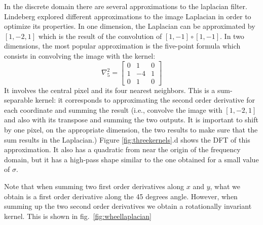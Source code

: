 In the discrete domain there are several approximations to the laplacian filter. Lindeberg \cite{} explored different approximations to the image Laplacian in order to optimize its properties. In one dimension, the Laplacian can be approximated by $\left[ 1,-2,1 \right]$ which is the result of the convolution of $\left[1,-1 \right] \circ \left[1,-1 \right]$.
In two dimensions, the most popular approximation is the five-point formula which consists in convolving the image with the kernel:
\begin{equation}
\nabla_5^2 = 
\begin{bmatrix}
  0& 1 & 0 \\
  1 & -4 & 1\\
  0 &  1 & 0
\end{bmatrix}
\end{equation}
It involves the central pixel and its four nearest neighbors. This is a sum-separable kernel: it corresponds to approximating the second order derivative for each coordinate and summing the result (i.e., convolve the image with $\left[1,-2,1\right]$ and also with its transpose and summing the two outputs. It is important to shift by one pixel, on the appropriate dimension, the two results to make sure that the sum results in the Laplacian.) Figure \ref{fig:threekernels}.d shows the DFT of this approximation. It also has a quadratic from near the origin of the frequency domain, but it has a high-pass shape similar to the one obtained for a small value of $\sigma$.

Note that when summing two first order derivatives along $x$ and $y$, what we obtain is a first order derivative along the 45 degrees angle. However, when summing up the two second order derivatives we obtain a rotationally invariant kernel. This is shown in fig.~\ref{fig:wheellaplacian}


